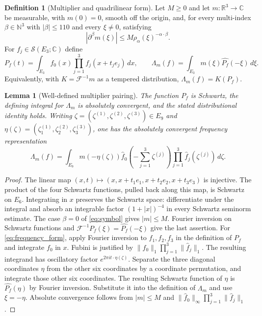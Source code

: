 \documentclass[12pt,reqno]{amsart}
\theoremstyle{plain}
\newtheorem{lemma}[theorem]{Lemma}
\theoremstyle{definition}
\newtheorem{definition}[theorem]{Definition}
\theoremstyle{remark}
\numberwithin{equation}{section}
\newcommand{\R}{\mathbb R}
\newcommand{\C}{\mathbb C}
\newcommand{\N}{\mathbb N}
\newcommand{\Sp}{\mathcal S}
\newcommand{\F}{\mathcal F}
\newcommand{\dd}{\,d}
\begin{document}
\begin{definition}[Multiplier and quadrilinear form]\label{def:multiplier}
Let $M\ge0$ and let $m:\R^3\to\C$ be measurable, with $m(0)=0$,
smooth off the origin, and, for every multi-index $\beta\in\N^3$ with
$|\beta|\le110$ and every $\xi\ne0$, satisfying
\begin{equation}\label{eq:symbol}
 |\partial^\beta m(\xi)|\le M\rho_\alpha(\xi)^{-\alpha\cdot\beta}.
\end{equation}
For $f_j\in\Sp(E_3;\C)$ define
\[
 P_f(t)=\int_{E_3}f_0(x)\prod_{j=1}^3f_j(x+t_je_j)\dd x,
 \qquad
 \Lambda_m(f)=\int_{E_3}m(\xi)\widehat {P_f}(-\xi)\dd\xi.
\]
Equivalently, with $K=\F^{-1}m$ as a tempered distribution,
$\Lambda_m(f)=K(P_f)$.
\end{definition}

\begin{lemma}[Well-defined multiplier pairing]\label{lem:pairing}
The function $P_f$ is Schwartz, the defining integral for $\Lambda_m$
is absolutely convergent, and the stated distributional identity holds.
Writing $\zeta=(\zeta^{(1)},\zeta^{(2)},\zeta^{(3)})\in E_9$ and
$\eta(\zeta)=(\zeta^{(1)}_1,\zeta^{(2)}_2,\zeta^{(3)}_3)$, one has
the absolutely convergent frequency representation
\begin{equation}\label{eq:frequency_form}
 \Lambda_m(f)=\int_{E_9}m(-\eta(\zeta))
   \widehat f_0\left(-\sum_{j=1}^3\zeta^{(j)}\right)
                 \prod_{j=1}^3\widehat f_j(\zeta^{(j)})\dd\zeta.
\end{equation}
\end{lemma}
\begin{proof}
The linear map
$(x,t)\mapsto(x,x+t_1e_1,x+t_2e_2,x+t_3e_3)$ is injective.
The product of the four Schwartz functions, pulled back along this map,
is Schwartz on $E_6$. Integrating in $x$ preserves the Schwartz space:
differentiate under the integral and absorb an integrable factor
$(1+|x|)^{-4}$ in every Schwartz seminorm estimate.
The case $\beta=0$ of \eqref{eq:symbol} gives $|m|\le M$.
Fourier inversion on Schwartz functions and
$\F^{-1}P_f(\xi)=\widehat {P_f}(-\xi)$ give the last assertion.
For \eqref{eq:frequency_form}, apply Fourier inversion to $f_1,f_2,f_3$
in the definition of $P_f$ and integrate $f_0$ in $x$. Fubini is
justified by $\|f_0\|_1\prod_{j=1}^3\|\widehat f_j\|_1$.
The resulting integrand has oscillatory factor
$e^{2\pi i t\cdot\eta(\zeta)}$. Separate the three diagonal
coordinates $\eta$ from the other six coordinates by a coordinate
permutation, and integrate those other six coordinates. The resulting
Schwartz function of $\eta$ is $\widehat {P_f}(\eta)$ by Fourier
inversion. Substitute it into the definition of $\Lambda_m$ and use
$\xi=-\eta$. Absolute convergence follows from $|m|\le M$ and
$\|\widehat f_0\|_\infty\prod_{j=1}^3\|\widehat f_j\|_1$.
\end{proof}
\end{document}
